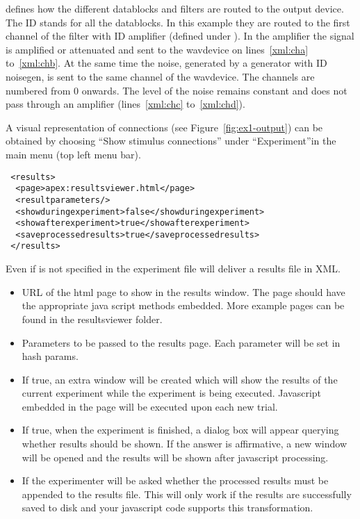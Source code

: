 
 defines how the different datablocks and
filters are routed to the output device. The ID  stands
for all the datablocks. In this example they are routed to the
first channel of the filter with ID {amplifier} (defined under
). In the amplifier the signal is amplified or
attenuated and sent to the wavdevice on lines~\ref{xml:cha}
to~\ref{xml:chb}. At the same time the noise, generated by a
generator with ID noisegen, is sent to the same channel of the
wavdevice. The channels are numbered from 0 onwards. The level of
the noise remains constant and does not pass through an amplifier
(lines~\ref{xml:chc} to~\ref{xml:chd}).

A visual representation of connections (see Figure~\ref{fig:ex1-output}) can be obtained by choosing
``Show stimulus connections'' under ``Experiment''in the main
\apex menu (top left menu bar).


\begin{lstlisting}
 <results>
  <page>apex:resultsviewer.html</page>
  <resultparameters/>
  <showduringexperiment>false</showduringexperiment>
  <showafterexperiment>true</showafterexperiment>
  <saveprocessedresults>true</saveprocessedresults>
 </results>
\end{lstlisting}

Even if  is not specified in the experiment file
\apex will deliver a results file in XML.


\begin{itemize} 
\item {} URL of the html page to show in the results window. The page should have the appropriate java script methods embedded. More example pages can be found in the \apex resultsviewer folder.
\item {} Parameters to be passed to the results page. Each parameter will be set in hash params. 
\item {} If true, an extra window will be created which will show the results of the current experiment while the experiment is being executed. Javascript embedded in the page will be executed upon each new trial.
\item {} If true, when the experiment is finished, a dialog box will appear querying whether results should be shown. If the answer is affirmative, a new window will be opened and the results will be shown after javascript processing.
\item {} If  the
experimenter will be asked whether the processed results must be
appended to the results file. This will only work if the results are successfully saved to disk and your javascript code supports this transformation.
\end{itemize}

